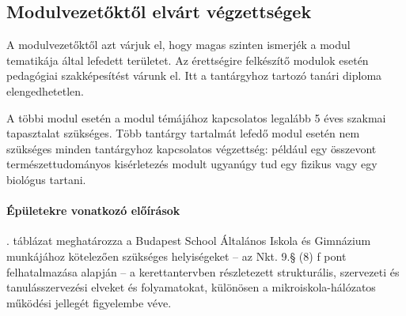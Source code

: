 \subsection{Modulvezetőktől elvárt végzettségek}
A modulvezetőktől azt várjuk el, hogy magas szinten ismerjék a modul tematikája által lefedett területet. Az érettségire felkészítő modulok esetén pedagógiai szakképesítést várunk el. Itt a tantárgyhoz tartozó tanári diploma elengedhetetlen.

A többi modul esetén a modul témájához kapcsolatos legalább 5 éves szakmai tapasztalat szükséges. Több tantárgy tartalmát lefedő modul esetén nem szükséges minden tantárgyhoz kapcsolatos végzettség: például egy összevont természettudományos kisérletezés modult ugyanúgy tud egy fizikus vagy egy biológus tartani.

\paragraph{Épületekre vonatkozó előírások}
. táblázat meghatározza a Budapest School Általános Iskola
és Gimnázium munkájához kötelezően szükséges helyiségeket -- az Nkt. 9.§ (8) f pont felhatalmazása alapján -- a kerettantervben részletezett strukturális, szervezeti és tanulásszervezési elveket és folyamatokat, különösen a mikroiskola-hálózatos működési jellegét figyelembe véve.


